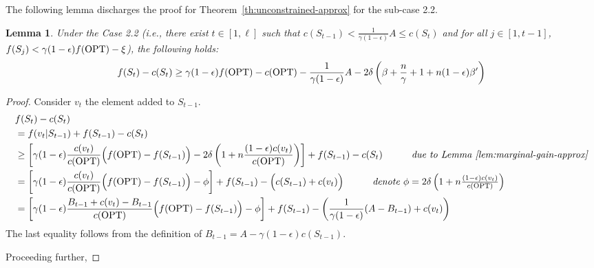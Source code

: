 \documentclass[10pt]{article} %
\newtheorem{lemma}[theorem]{Lemma}
\theoremstyle{remark}
\newcommand{\OPT}{{\rm OPT}}
\begin{document}
            

The following lemma discharges the proof for Theorem~\ref{th:unconstrained-approx} for the sub-case 2.2. 


\begin{lemma} 
    \label{lem:unconstrained-h_St-approx}
Under the Case 2.2 (i.e., 
there exist $t\in[1, \ell]$ such that
$c(S_{t-1})< \frac{1}{\gamma (1-\epsilon)} A  \leq c(S_t)$
and for all $j\in[1, t-1]$, $f(S_{j}) < \gamma (1-\epsilon)f(\OPT)-\xi$),
the following holds:
    \[f(S_t)-c(S_t) \geq \gamma(1-\epsilon)f(\OPT)-c(\OPT) - \frac{1}{\gamma(1-\epsilon)}A - 2\delta\left(\beta+ \frac{n}{\gamma} + 1 + n(1-\epsilon)\beta'\right) \]
\end{lemma}

\begin{proof}

Consider $v_t$ the element added to $S_{t-1}$.
\begin{align*}
    & f(S_t)-c(S_t) \\
    &=f(v_t|S_{t-1})+f(S_{t-1})-{c(S_t)}\\
    &\geq \left[\gamma(1-\epsilon) \displaystyle\frac{c(v_t)}{c(\OPT)} \Big ( f(\OPT) - f(S_{t-1}) \Big ) - 2\delta  \left( 1+n\frac{(1-\epsilon)c(v_t)}{ c(\OPT)} \right)\right]  +  f(S_{t-1})-c(S_t) \quad\quad\quad \mbox{\it due to Lemma~\ref{lem:marginal-gain-approx}} \\
    & = \left[\gamma(1-\epsilon) \displaystyle\frac{c(v_t)}{c(\OPT)} \Big ( f(\OPT) - f(S_{t-1}) \Big ) - \phi \right] +f(S_{t-1})- {\Big(c(S_{t-1})+c(v_t)\Big)} \quad\quad\quad \mbox{\it denote $\phi = 2\delta  \left( 1+n\frac{(1-\epsilon)c(v_t)}{ c(\OPT)} \right)$}\\    
    &= \left[\gamma(1-\epsilon) \displaystyle\frac{B_{t-1}+c(v_t)-B_{t-1}}{c(\OPT)} \Big ( f(\OPT) - f(S_{t-1}) \Big ) - \phi\right]  +f(S_{t-1})- {\left(\displaystyle\frac{1}{\gamma(1-\epsilon)}(A-B_{t-1})+c(v_t)\right)}
\end{align*}
The last equality follows from the definition of  $B_{t-1} = A-\gamma (1-\epsilon) c(S_{t-1})$.

\smallskip
Proceeding further, 


\end{proof}
\end{document}
